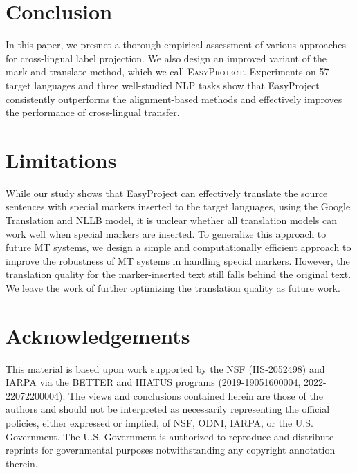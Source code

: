 \documentclass[11pt,dvipsnames]{article}
\begin{document}
\vspace{-1pt}
\section{Conclusion}
In this paper, we presnet a thorough empirical assessment of various approaches for cross-lingual label projection. We also design an improved variant of the mark-and-translate method, which we call \textsc{EasyProject}. Experiments on  57 target languages and  three well-studied NLP tasks show that EasyProject consistently outperforms the alignment-based methods and effectively improves the performance of cross-lingual transfer.















\section*{Limitations}
While our study shows that EasyProject can effectively translate the source sentences with special markers inserted to the target languages, using the Google Translation and NLLB model, it is unclear whether all translation models can work well when special markers are inserted. 
To generalize this approach to future MT systems, we design a simple and computationally efficient approach to improve the robustness of MT systems in handling special markers.
However, the translation quality for the  marker-inserted text still falls behind the original text. We leave the work of further optimizing the translation quality as future work.


\section*{Acknowledgements}
This material is based upon work supported by the NSF (IIS-2052498) and IARPA via the BETTER and HIATUS programs (2019-19051600004, 2022-22072200004). The views and conclusions contained herein are those of the authors and should not be interpreted as necessarily representing the official policies, either expressed or implied, of NSF, ODNI, IARPA, or the U.S. Government. The U.S. Government is authorized to reproduce and distribute reprints for governmental purposes notwithstanding any copyright annotation therein.
\end{document}
